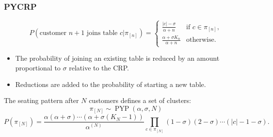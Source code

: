 \begin{frame}
    \frametitle{PYCRP}

    \[
        P(\text{customer }n+1\text{ joins table }c|\pi_{[n]}) = 
          \begin{cases}
           \frac{|c|-\sigma}{\alpha+n} & \text{if } c \in \pi_{[n]}, \\
           \frac{\alpha+\sigma K_n}{\alpha+n}       & \text{otherwise.}
          \end{cases}
    \]
    \begin{itemize}
        \item The probability of joining an existing table is reduced by an amount proportional to $\sigma$ relative to the CRP.
        \item Reductions are added to the probability of starting a new table.
    \end{itemize}

    The seating pattern after $N$ customers defines a set of clusters: \[\pi_{[N]}\sim\operatorname{PYP}(\alpha,\sigma,N)\]
    \[
        P(\pi_{[N]}) = \frac{\alpha(\alpha+\sigma)\cdots(\alpha+\sigma(K_N-1))}{\alpha^{(N)}}\prod_{c\in\pi_{[N]}}(1-\sigma)(2-\sigma)\cdots(|c|-1-\sigma).
    \]
\end{frame}

